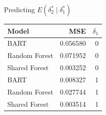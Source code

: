 \documentclass{beamer}
\begin{document}
\begin{frame}{Predicting $E(\delta_2^* \mid \delta_1^*)$ }
\begin{table}[ht]
\centering
\begin{tabular}{lrr}
  \hline
Model & MSE & $\delta_1$ \\ 
  \hline
BART & 0.056580 & 0 \\ 
  Random Forest & 0.071952 & 0 \\ 
  Shared Forest & 0.003252 & 0 \\ 
  BART & 0.008327 & 1 \\ 
  Random Forest & 0.027744 & 1 \\ 
  Shared Forest & 0.003514 & 1 \\ 
   \hline
\end{tabular}
\end{table}
\end{frame}
\end{document}
